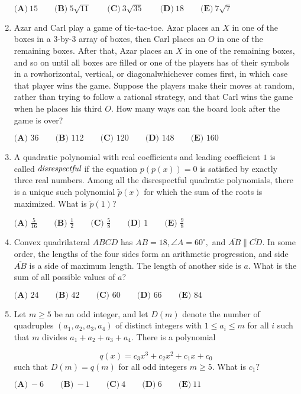 \documentclass{article}
\begin{document}
\begin{enumerate}[label=\arabic*., itemsep=0.5em]
\(\textbf{(A)}\: 15\qquad\textbf{(B)} \: 5\sqrt{11}\qquad\textbf{(C)} \: 3\sqrt{35}\qquad\textbf{(D)} \: 18\qquad\textbf{(E)} \: 7\sqrt{7}\)\par \vspace{0.5em}\item Azar and Carl play a game of tic-tac-toe. Azar places an \(X\) in one of the boxes in a \(3\)-by-\(3\) array of boxes, then Carl places an \(O\) in one of the remaining boxes. After that, Azar places an \(X\) in one of the remaining boxes, and so on until all boxes are filled or one of the players has of their symbols in a rowhorizontal, vertical, or diagonalwhichever comes first, in which case that player wins the game. Suppose the players make their moves at random, rather than trying to follow a rational strategy, and that Carl wins the game when he places his third \(O\). How many ways can the board look after the game is over?

\(\textbf{(A) } 36 \qquad\textbf{(B) } 112 \qquad\textbf{(C) } 120 \qquad\textbf{(D) } 148 \qquad\textbf{(E) } 160\)\par \vspace{0.5em}\item A quadratic polynomial with real coefficients and leading coefficient \(1\) is called \(\emph{disrespectful}\) if the equation \(p(p(x))=0\) is satisfied by exactly three real numbers. Among all the disrespectful quadratic polynomials, there is a unique such polynomial \(\tilde{p}(x)\) for which the sum of the roots is maximized. What is \(\tilde{p}(1)\)?

\(\textbf{(A) } \frac{5}{16} \qquad\textbf{(B) } \frac{1}{2} \qquad\textbf{(C) } \frac{5}{8} \qquad\textbf{(D) } 1 \qquad\textbf{(E) } \frac{9}{8}\)\par \vspace{0.5em}\item Convex quadrilateral \(ABCD\) has \(AB = 18, \angle{A} = 60^\circ,\) and \(\overline{AB} \parallel \overline{CD}.\) In some order, the lengths of the four sides form an arithmetic progression, and side \(\overline{AB}\) is a side of maximum length. The length of another side is \(a.\) What is the sum of all possible values of \(a\)?

\(\textbf{(A) } 24 \qquad \textbf{(B) } 42 \qquad \textbf{(C) } 60 \qquad \textbf{(D) } 66 \qquad \textbf{(E) } 84\)\par \vspace{0.5em}\item Let \(m\ge 5\) be an odd integer, and let \(D(m)\) denote the number of quadruples \((a_1, a_2, a_3, a_4)\) of distinct integers with \(1\le a_i \le m\) for all \(i\) such that \(m\) divides \(a_1+a_2+a_3+a_4\). There is a polynomial

\begin{equation*}
q(x) = c_3x^3+c_2x^2+c_1x+c_0
\end{equation*}
such that \(D(m) = q(m)\) for all odd integers \(m\ge 5\). What is \(c_1?\)

\(\textbf{(A)}\ {-}6\qquad\textbf{(B)}\ {-}1\qquad\textbf{(C)}\ 4\qquad\textbf{(D)}\ 6\qquad\textbf{(E)}\ 11\)\par \vspace{0.5em}
\end{enumerate}
\end{document}
